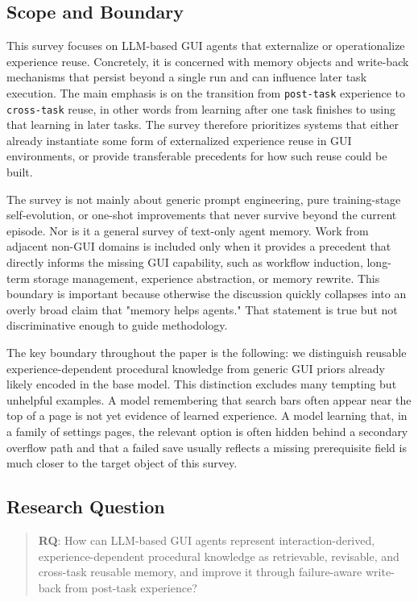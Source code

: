 \documentclass{article}
\begin{document}
\subsection{Scope and Boundary}\label{22-scope-and-boundary}

This survey focuses on LLM-based GUI agents that externalize or
operationalize experience reuse. Concretely, it is concerned with memory
objects and write-back mechanisms that persist beyond a single run and
can influence later task execution. The main emphasis is on the
transition from \texttt{post-task} experience to \texttt{cross-task}
reuse, in other words from learning after one task finishes to using
that learning in later tasks. The survey therefore prioritizes systems
that either already instantiate some form of externalized experience
reuse in GUI environments, or provide transferable precedents for how
such reuse could be built.

The survey is not mainly about generic prompt engineering, pure
training-stage self-evolution, or one-shot improvements that never
survive beyond the current episode. Nor is it a general survey of
text-only agent memory. Work from adjacent non-GUI domains is included
only when it provides a precedent that directly informs the missing GUI
capability, such as workflow induction, long-term storage management,
experience abstraction, or memory rewrite. This boundary is important
because otherwise the discussion quickly collapses into an overly broad
claim that "memory helps agents." That statement is true but not
discriminative enough to guide methodology.

The key boundary throughout the paper is the following: we distinguish
reusable experience-dependent procedural knowledge from generic GUI
priors already likely encoded in the base model. This distinction
excludes many tempting but unhelpful examples. A model remembering that
search bars often appear near the top of a page is not yet evidence of
learned experience. A model learning that, in a family of settings
pages, the relevant option is often hidden behind a secondary overflow
path and that a failed save usually reflects a missing prerequisite
field is much closer to the target object of this survey.

\subsection{Research Question}\label{23-research-question}

\begin{quote}
\textbf{RQ}: How can LLM-based GUI agents represent interaction-derived,
experience-dependent procedural knowledge as retrievable, revisable, and
cross-task reusable memory, and improve it through failure-aware
write-back from post-task experience?
\end{quote}
\end{document}
